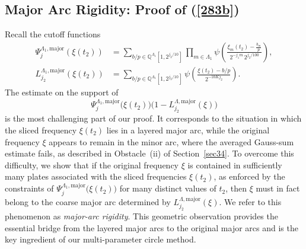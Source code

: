 \documentclass[11 pt,letterpaper]{amsart}
\theoremstyle{plain}
\theoremstyle{definition}
\theoremstyle{remark} \theoremstyle{exam} \theoremstyle{ob}
\numberwithin{equation}{section}
\begin{document}
\subsection{Major Arc Rigidity: Proof of (\ref{283b})}\label{sec5.3}
Recall the cutoff functions
\begin{align*}
	\Psi_j^{\Lambda_1,\mathrm{major}}(\xi(t_2))
	&= \sum_{b/p\in \mathbb{Q}^{\Lambda_1}[1,2^{j_2/10}]}
	\prod_{m\in \Lambda_1}
	\psi\!\left(
	\frac{\xi_m(t_2)-\frac{b_m}{p}}
	{2^{-j_1 m}\,2^{j_2/100}}
	\right),\\
	L^{\Lambda_1,\mathrm{major}}_{j_2}(\xi(t_2)) &=\sum_{b/p\in \mathbb{Q}^{\Lambda_1}[1,2^{j_2/10}]  }  \psi\left(\frac{\xi(t_2)-b/p}{2^{-10Kj_2}}\right).
\end{align*}
The estimate on the support of
\[
\Psi_{j}^{\Lambda_1,\mathrm{major}}\!\bigl(\xi(t_2)\bigr)
\bigl(1-L^{\Lambda,\mathrm{major}}_{j_2}(\xi)\bigr)
\]
is the most challenging part of our proof. It corresponds to the situation in which the sliced frequency $\xi(t_2)$ lies in a layered major arc, while the original frequency $\xi$ appears to remain in the minor arc, where the averaged Gauss-sum estimate fails, as described in Obstacle~(ii) of Section~\ref{sec34}. To overcome this difficulty, we show that if the original frequency $\xi$ is contained in sufficiently many plates associated with the sliced frequencies $\xi(t_2)$, as enforced by the constraints of
$\Psi_{j}^{\Lambda_1,\mathrm{major}}\!\bigl(\xi(t_2)\bigr)$
for many distinct values of $t_2$, then $\xi$ must in fact belong to the coarse major arc determined by
$L^{\Lambda,\mathrm{major}}_{j_2}(\xi)$. We refer to this phenomenon as \emph{major-arc rigidity}.
This geometric observation provides the essential bridge from the layered major arcs to the original major arcs and is the key ingredient of our multi-parameter circle method. 



 
\end{document}
